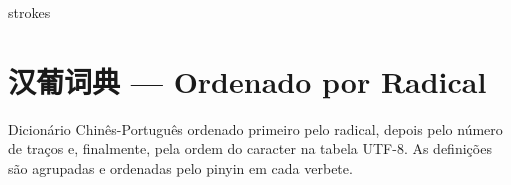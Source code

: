 \documentclass[a4paper,9pt,twoside,openright,book]{memoir}
\begin{document}
\clearpage
\begin{DictionaryEntries}{strokes}
 
 
 
 
 
 
 
 
 
 
 
 
 
 
 
 
 
 
 
 
 
 
%
%
%
%
%
%
%
%
%
\end{DictionaryEntries}

\clearpage
\pagestyle{empty}
\chapter{汉葡词典 --- Ordenado por Radical}

%
%

Dicionário Chinês-Português ordenado primeiro pelo radical,
depois pelo número de traços e, finalmente, pela ordem do
caracter na tabela UTF-8.  As definições são agrupadas e
ordenadas pelo pinyin em cada verbete.
\end{document}
